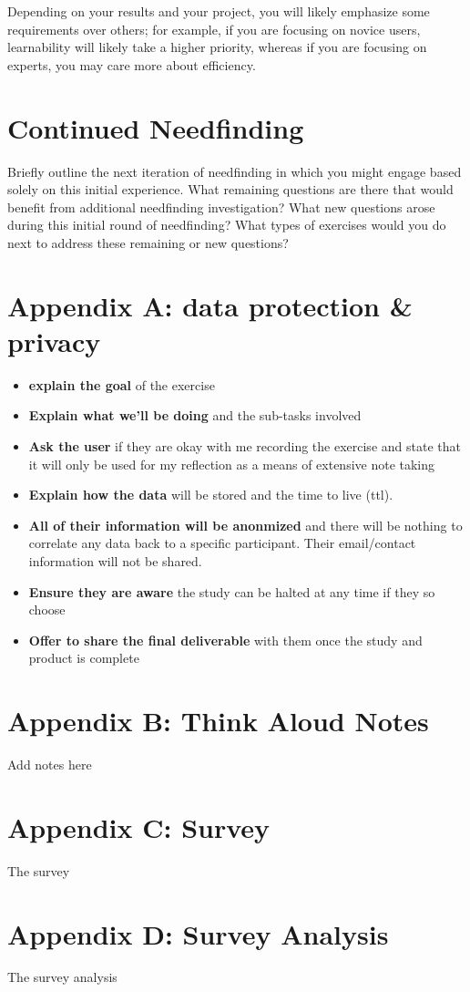 Depending on your results and your project, you will likely emphasize some requirements over others; for example, if you are focusing on novice users, learnability will likely take a higher priority, whereas if you are focusing on experts, you may care more about efficiency.


\section{Continued Needfinding}
Briefly outline the next iteration of needfinding in which you might engage based solely on this initial experience. What remaining questions are there that would benefit from additional needfinding investigation? What new questions arose during this initial round of needfinding? What types of exercises would you do next to address these remaining or new questions?


\section{Appendix A: data protection & privacy}

\begin{itemize}
\item
  \textbf{explain the goal} of the exercise
\item
  \textbf{Explain what we'll be doing} and the sub-tasks involved
\item
  \textbf{Ask the user} if they are okay with me recording the exercise and state that it will only be used for my reflection as a means of extensive note taking
\item
  \textbf{Explain how the data} will be stored and the time to live (ttl).
\item
  \textbf{All of their information will be anonmized} and there will be nothing to correlate any data back to a specific participant. Their email/contact information will not be shared.
\item
  \textbf{Ensure they are aware} the study can be halted at any time if they so choose
\item
  \textbf{Offer to share the final deliverable} with them once the study and product is complete
\end{itemize}


\section{Appendix B: Think Aloud Notes}
Add notes here


\section{Appendix C: Survey}
The survey


\section{Appendix D: Survey Analysis}
The survey analysis



